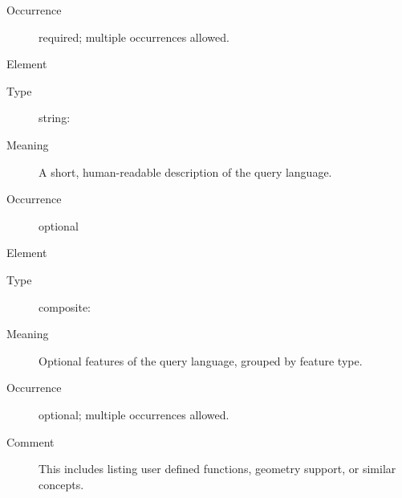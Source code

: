 \documentclass{ivoa}
\begin{document}
\begin{generated}
\begin{bigdescription}
\begin{description}
\item[Occurrence] required; multiple occurrences allowed.

\end{description}
\item[Element \xmlel{description}]
\begin{description}
\item[Type] string: 
\item[Meaning] 
          A short, human-readable description of the
          query language.
          
\item[Occurrence] optional

\end{description}
\item[Element \xmlel{languageFeatures}]
\begin{description}
\item[Type] composite: 
\item[Meaning] 
            Optional features of the query language, grouped by
            feature type.
          
\item[Occurrence] optional; multiple occurrences allowed.
\item[Comment] 
            This includes listing user defined functions, geometry support,
            or similar concepts.
          

\end{description}


\end{bigdescription}\endgroup

\endgroup
\end{generated}

\end{document}
